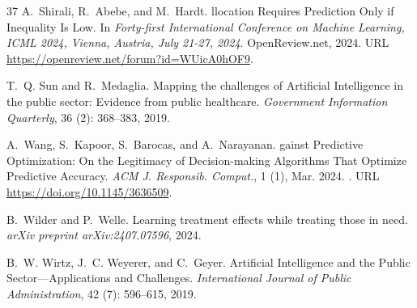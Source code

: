 \documentclass{article} %
\begin{document}
\begin{thebibliography}{37}
A.~Shirali, R.~Abebe, and M.~Hardt.
llocation {R}equires {P}rediction {O}nly if {I}nequality {I}s {L}ow.
\newblock In \emph{Forty-first International Conference on Machine Learning, {ICML} 2024, Vienna, Austria, July 21-27, 2024}. OpenReview.net, 2024.
\newblock URL \url{https://openreview.net/forum?id=WUicA0hOF9}.

T.~Q. Sun and R.~Medaglia.
\newblock Mapping the challenges of {A}rtificial {I}ntelligence in the public sector: {E}vidence from public healthcare.
\newblock \emph{Government Information Quarterly}, 36 (2): 368--383, 2019.

A.~Wang, S.~Kapoor, S.~Barocas, and A.~Narayanan.
gainst {P}redictive {O}ptimization: {O}n the {L}egitimacy of {D}ecision-making {A}lgorithms {T}hat {O}ptimize {P}redictive {A}ccuracy.
\newblock \emph{ACM J. Responsib. Comput.}, 1 (1), Mar. 2024.
\newblock {}.
\newblock URL \url{https://doi.org/10.1145/3636509}.

B.~Wilder and P.~Welle.
\newblock Learning treatment effects while treating those in need.
\newblock \emph{arXiv preprint arXiv:2407.07596}, 2024.

B.~W. Wirtz, J.~C. Weyerer, and C.~Geyer.
\newblock Artificial {I}ntelligence and the {P}ublic {S}ector—{A}pplications and {C}hallenges.
\newblock \emph{International Journal of Public Administration}, 42 (7): 596--615, 2019.

\end{thebibliography}
\end{document}
